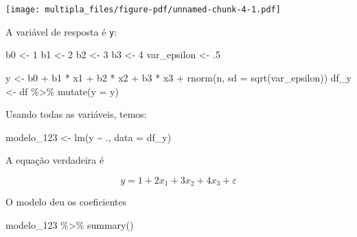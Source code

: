 \documentclass[
  letterpaper,
  DIV=11,
  numbers=noendperiod]{scrreprt}
\newenvironment{Shaded}{\begin{snugshade}}{\end{snugshade}}
\newcommand{\AttributeTok}[1]{\textcolor[rgb]{0.40,0.45,0.13}{#1}}
\newcommand{\DecValTok}[1]{\textcolor[rgb]{0.68,0.00,0.00}{#1}}
\newcommand{\FunctionTok}[1]{\textcolor[rgb]{0.28,0.35,0.67}{#1}}
\newcommand{\NormalTok}[1]{\textcolor[rgb]{0.00,0.23,0.31}{#1}}
\newcommand{\OtherTok}[1]{\textcolor[rgb]{0.00,0.23,0.31}{#1}}
\newcommand{\SpecialCharTok}[1]{\textcolor[rgb]{0.37,0.37,0.37}{#1}}
\begin{document}
\begin{center}
\texttt{[image: multipla\_files/figure-pdf/unnamed-chunk-4-1.pdf]}
\end{center}

A variável de resposta é \texttt{y}:

\begin{Shaded}
\begin{Highlighting}[]
\NormalTok{b0 }\OtherTok{\textless{}{-}} \DecValTok{1}
\NormalTok{b1 }\OtherTok{\textless{}{-}} \DecValTok{2}
\NormalTok{b2 }\OtherTok{\textless{}{-}} \DecValTok{3}
\NormalTok{b3 }\OtherTok{\textless{}{-}} \DecValTok{4}
\NormalTok{var\_epsilon }\OtherTok{\textless{}{-}}\NormalTok{ .}\DecValTok{5}

\NormalTok{y }\OtherTok{\textless{}{-}}\NormalTok{ b0 }\SpecialCharTok{+}\NormalTok{ b1 }\SpecialCharTok{*}\NormalTok{ x1 }\SpecialCharTok{+}\NormalTok{ b2 }\SpecialCharTok{*}\NormalTok{ x2 }\SpecialCharTok{+}\NormalTok{ b3 }\SpecialCharTok{*}\NormalTok{ x3 }\SpecialCharTok{+} \FunctionTok{rnorm}\NormalTok{(n, }\AttributeTok{sd =} \FunctionTok{sqrt}\NormalTok{(var\_epsilon))}
\NormalTok{df\_y }\OtherTok{\textless{}{-}}\NormalTok{ df }\SpecialCharTok{\%\textgreater{}\%} 
  \FunctionTok{mutate}\NormalTok{(}\AttributeTok{y =}\NormalTok{ y)}
\end{Highlighting}
\end{Shaded}

Usando todas as variáveis, temos:

\begin{Shaded}
\begin{Highlighting}[]
\NormalTok{modelo\_123 }\OtherTok{\textless{}{-}} \FunctionTok{lm}\NormalTok{(y }\SpecialCharTok{\textasciitilde{}}\NormalTok{ ., }\AttributeTok{data =}\NormalTok{ df\_y)}
\end{Highlighting}
\end{Shaded}

A equação verdadeira é

\[
y = 1 + 2 x_1 + 3 x_2 + 4 x_3 + \varepsilon
\]

O modelo deu os coeficientes

\begin{Shaded}
\begin{Highlighting}[]
\NormalTok{modelo\_123 }\SpecialCharTok{\%\textgreater{}\%} \FunctionTok{summary}\NormalTok{()}
\end{Highlighting}
\end{Shaded}
\end{document}
